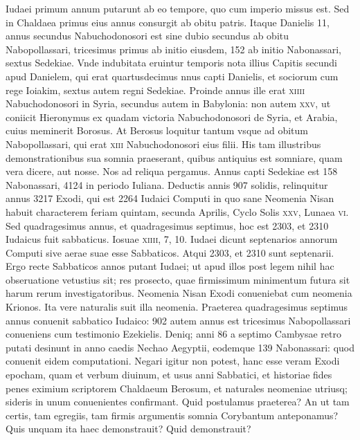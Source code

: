 Iudaei primum annum putarunt ab eo tempore, quo
cum imperio missus est. Sed in Chaldaea primus eius annus consurgit
ab obitu patris.
Itaque Danielis 11, annus secundus Nabuchodonosori
est sine dubio secundus ab obitu Nabopollassari, tricesimus
primus ab initio eiusdem, 152 ab initio Nabonassari, sextus
Sedekiae.
Vnde indubitata eruintur temporis nota illius Capitis secundi
apud Danielem, qui erat quartusdecimus nnus capti Danielis,
et sociorum cum rege Ioiakim, sextus autem regni Sedekiae.
Proinde annus ille erat \textsc{xiiii} Nabuchodonosori in Syria, secundus
autem in Babylonia: non autem \textsc{xxv}, ut coniicit Hieronymus
ex quadam victoria Nabuchodonosori de Syria, et Arabia, cuius
meminerit Borosus.
At Berosus loquitur tantum vsque ad obitum
Nabopollassari, qui erat \textsc{xiii} Nabuchodonosori eius filii.
His tam illustribus demonstrationibus sua somnia praeserant, quibus antiquius
est somniare, quam vera dicere, aut nosse.
Nos ad reliqua
pergamus.
Annus capti Sedekiae est 158 Nabonassari, 4124 in periodo Iuliana.
Deductis annis 907 solidis, relinquitur annus 3217
Exodi, qui est 2264 Iudaici Computi in quo sane Neomenia Nisan
habuit characterem feriam quintam, secunda Aprilis, Cyclo
Solis \textsc{xxv}, Lunaea \textsc{vi}.
Sed quadragesimus annus, et quadragesimus
septimus, hoc est 2303, et 2310 Iudaicus fuit sabbaticus.
Iosuae
\textsc{xiiii}, 7, 10.
Iudaei dicunt septenarios annorum Computi sive aerae
suae esse Sabbaticos.
Atqui 2303, et 2310 sunt septenarii.
Ergo recte
Sabbaticos annos putant Iudaei; ut apud illos post legem nihil
hac obseruatione vetustius sit; res prosecto, quae firmissimum
minimentum futura sit harum rerum investigatoribus.
Neomenia Nisan Exodi conueniebat cum neomenia Krionos.
Ita vere naturalis suit illa neomenia.
Praeterea quadragesimus septimus
annus conuenit sabbatico Iudaico: 902 autem annus est tricesimus
Nabopollassari conueniens cum testimonio Ezekielis.
Deniq; anni 86 a septimo Cambysae retro putati desinunt in anno
caedis Nechao Aegyptii, eodemque 139 Nabonassari: quod conuenit
eidem computationi.
Negari igitur non potest, hanc esse veram
Exodi epocham, quam et verbum diuinum, et usus anni Sabbatici,
et historiae fides penes eximium scriptorem Chaldaeum
Berosum, et naturales neomeniae utriusq; sideris in unum conuenientes
confirmant.
Quid postulamus praeterea?
An ut tam certis,
tam egregiis, tam firmis argumentis somnia Corybantum anteponamus?
Quis unquam ita haec demonstrauit?
Quid demonstrauit?
{}

